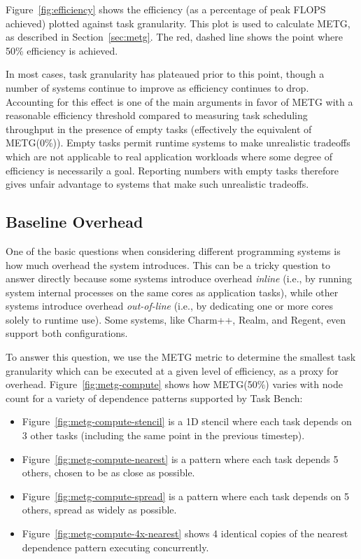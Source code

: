 Figure~\ref{fig:efficiency} shows the efficiency (as a percentage of
peak FLOPS achieved) plotted against task granularity. This plot is
used to calculate METG, as described in Section~\ref{sec:metg}. The
red, dashed line shows the point where 50\% efficiency is achieved.

In most cases, task granularity has plateaued prior to this point,
though a number of systems continue to improve as efficiency continues
to drop. Accounting for this effect is one of the main arguments in
favor of METG with a reasonable efficiency threshold compared to
measuring task scheduling throughput in the presence of empty tasks
(effectively the equivalent of METG(0\%)). Empty tasks permit runtime
systems to make unrealistic tradeoffs which are not applicable to real
application workloads where some degree of efficiency is necessarily a
goal. Reporting numbers with empty tasks therefore gives unfair
advantage to systems that make such unrealistic tradeoffs.

\subsection{Baseline Overhead}

One of the basic questions when considering different programming
systems is how much overhead the system introduces. This can be a
tricky question to answer directly because some systems introduce
overhead \emph{inline} (i.e., by running system internal processes on
the same cores as application tasks), while other systems introduce
overhead \emph{out-of-line} (i.e., by dedicating one or more cores
solely to runtime use). Some systems, like Charm++, Realm, and Regent,
even support both configurations.

To answer this question, we use the METG metric to determine the
smallest task granularity which can be executed at a given level of
efficiency, as a proxy for overhead. Figure~\ref{fig:metg-compute}
shows how METG(50\%) varies with node count for a variety of
dependence patterns supported by Task Bench:

\begin{itemize}
\item Figure~\ref{fig:metg-compute-stencil} is a 1D stencil where each
  task depends on 3 other tasks (including the same point in the
  previous timestep).
\item Figure~\ref{fig:metg-compute-nearest} is a pattern where each
  task depends 5 others, chosen to be as close as possible.
\item Figure~\ref{fig:metg-compute-spread} is a pattern where each
  task depends on 5 others, spread as widely as possible.
\item Figure~\ref{fig:metg-compute-4x-nearest} shows 4 identical
  copies of the nearest dependence pattern executing concurrently.
\end{itemize}

